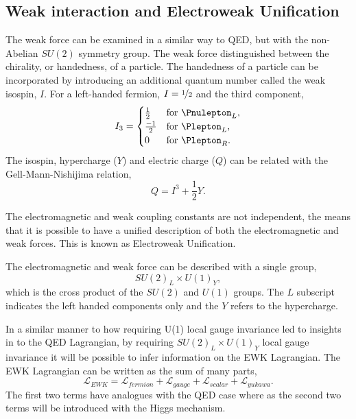 \subsection{Weak interaction and Electroweak Unification}

The weak force can be examined in a similar way to QED, but with the non-Abelian
$SU(2)$ symmetry group. The weak force distinguished between the chirality, or
handedness, of a particle.
The handedness of a particle can be incorporated by introducing an additional
quantum number called the weak isospin, $I$.
For a left-handed fermion, $I=\nicefrac{1}{2}$ and the third component,
\begin{equation}
I_{3} =
  \begin{cases}
    \frac{1}{2}  & \text{for \Pnulepton}_L,  \\
    \frac{-1}{2} & \text{for \Plepton}_L, \\
    0            & \text{for \Plepton}_R.
  \end{cases}
\end{equation}
The isospin, hypercharge ($Y$) and electric charge ($Q$) can be related with the
Gell-Mann-Nishijima relation,
\begin{equation}
Q = I^{3} + \frac{1}{2}Y.
\end{equation}

The electromagnetic and weak coupling constants are not independent, the means that it is
possible to have a unified description of both the electromagnetic and weak
forces. This is known as Electroweak Unification.

The electromagnetic and weak force can be described with a single group,
\begin{equation}
SU(2)_{L} \times U(1)_{Y},
\end{equation}
which is the cross product of the $SU(2)$ and $U(1)$ groups. The $L$ subscript
indicates the left handed components only and the $Y$ refers to the hypercharge.

In a similar manner to how requiring U(1) local gauge invariance led to insights
in to the QED Lagrangian, by requiring $SU(2)_{L} \times U(1)_{Y}$ local gauge
invariance it will be possible to infer information on the EWK Lagrangian.
The EWK Lagrangian can be written as the sum of many parts,
\begin{equation}
\mathcal{L}_{EWK} = 
\mathcal{L}_{fermion}
+ \mathcal{L}_{gauge}
+ \mathcal{L}_{scalar}
+ \mathcal{L}_{yukawa}.
\end{equation}
The first two terms have analogues with the QED case where as the second two
terms will be introduced with the Higgs mechanism.

